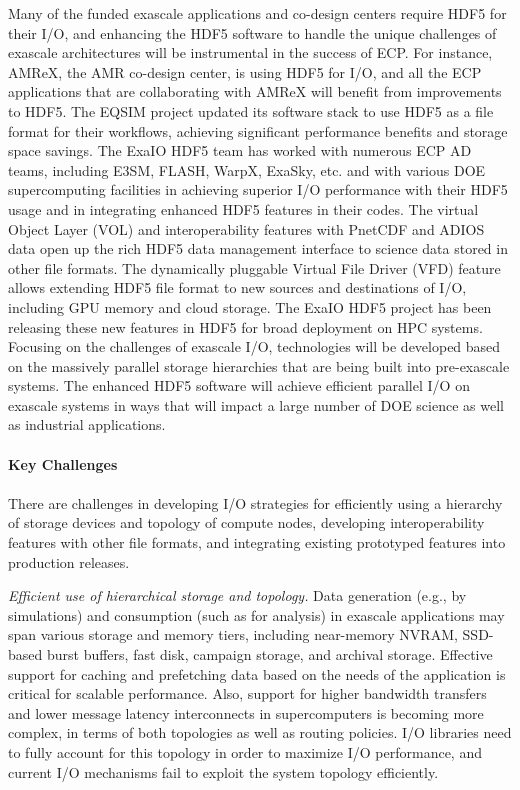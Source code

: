 Many of the funded exascale applications and co-design centers require HDF5 for their I/O, and enhancing the HDF5 software to handle the unique challenges of exascale architectures will be instrumental in the success of ECP. For instance, AMReX, the AMR co-design center, is using HDF5 for I/O, and all the ECP applications that are collaborating with AMReX will benefit from improvements to HDF5. The EQSIM project updated its software stack to use HDF5 as a file format for their workflows, achieving significant performance benefits and storage space savings. The ExaIO HDF5 team has worked with numerous ECP AD teams, including E3SM, FLASH, WarpX, ExaSky, etc. and with various DOE supercomputing facilities in achieving superior I/O performance with their HDF5 usage and in integrating enhanced HDF5 features in their codes.
The virtual Object Layer (VOL) and interoperability features with PnetCDF and ADIOS data open up the rich HDF5 data management interface to science data stored in other file formats. The dynamically pluggable Virtual File Driver (VFD) feature allows extending HDF5 file format to new sources and destinations of I/O, including GPU memory and cloud storage. The ExaIO HDF5 project has been releasing these new features in HDF5 for broad deployment on HPC systems. Focusing on the challenges of exascale I/O, technologies will be developed based on the massively parallel storage hierarchies that are being built into pre-exascale systems. The enhanced HDF5 software will achieve efficient parallel I/O on exascale systems in ways that will impact a large number of DOE science as well as industrial applications.

\paragraph{Key  Challenges}
\paragraph{}
There are challenges in developing I/O strategies for efficiently using a hierarchy of storage devices and topology of compute nodes, developing interoperability features with other file formats, and integrating existing prototyped features into production releases. 

\textit{Efficient use of hierarchical storage and topology.} Data generation (e.g., by simulations) and consumption (such as for analysis) in exascale applications may span various storage and memory tiers, including near-memory NVRAM, SSD-based burst buffers, fast disk, campaign storage, and archival storage. Effective support for caching and prefetching data based on the needs of the application is critical for scalable performance. Also, support for higher bandwidth transfers and lower message latency interconnects in supercomputers is becoming more complex, in terms of both topologies as well as routing policies. I/O libraries need to fully account for this topology in order to maximize I/O performance, and current I/O mechanisms fail to exploit the system topology efficiently.

